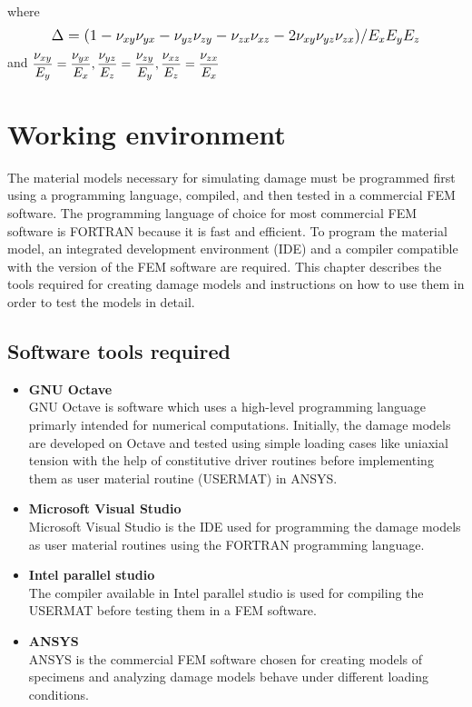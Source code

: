 \documentclass[12pt,a4paper,twoside,openright]{report}
\begin{document}
 where 
 \begin{align*}
\mathlarger{ \Delta = (1 - \nu_{xy}\nu_{yx} - \nu_{yz}\nu_{zy} - \nu_{zx}\nu_{xz} - 2\nu_{xy}\nu_{yz}\nu_{zx})/E_{x}E_{y}E_{z}}
 \end{align*}
   and  $\mathlarger{\frac{\nu_{xy}}{E_{y}} = \frac{\nu_{yx}}{E_{x}}, \frac{\nu_{yz}}{E_{z}} = \frac{\nu_{zy}}{E_{y}}, \frac{\nu_{xz}}{E_{z}} = \frac{\nu_{zx}}{E_{x}} }$ 


\newpage
{} 
\chapter{Working environment}
\vspace*{1cm}
\indent\indent\indent  The material models necessary for simulating damage must be programmed first using a programming language, compiled, and then tested in a commercial FEM software. The programming language of choice for most commercial FEM software is FORTRAN because it is fast and efficient. To program the material model, an integrated development environment (IDE) and a compiler compatible with the version of the FEM software are required. This chapter describes the tools required for creating damage models and instructions on how to use them in order to test the models in detail.   
\vspace*{1cm}
\section{Software tools required}
\begin{itemize}
\item \textbf{GNU Octave}\\ \indent
\hspace*{13mm} GNU Octave is software which uses a high-level programming language primarly intended for numerical computations. Initially, the damage models are developed on Octave and tested using simple loading cases like uniaxial tension with the help of constitutive driver routines before implementing them as user material routine (USERMAT) in ANSYS. 
\item \textbf{Microsoft Visual Studio }\\
\hspace*{13mm} Microsoft Visual Studio is the IDE used for programming the damage models as user material routines using the FORTRAN programming language.
\item \textbf{Intel parallel studio}\\
\hspace*{13mm} The compiler available in Intel parallel studio is used for compiling the USERMAT before testing them in a FEM software.
\item \textbf{ANSYS }\\
\hspace*{13mm}ANSYS is the commercial FEM software chosen for creating models of specimens and analyzing damage models behave under different loading conditions.
\end{itemize}
\end{document}
